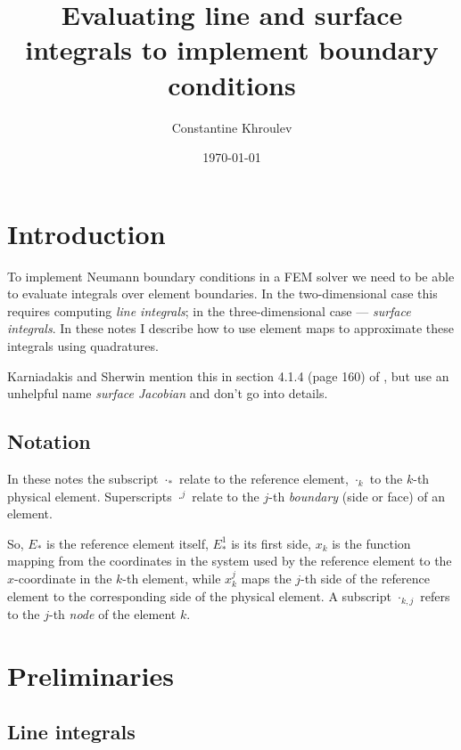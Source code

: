 \documentclass[11pt]{article}
\author{Constantine Khroulev}
\date{\today}
\title{Evaluating line and surface integrals to implement boundary conditions}
\begin{document}
\maketitle
\tableofcontents

\newcommand{\dx}{\Delta x}
\newcommand{\dy}{\Delta y}
\newcommand{\Real}{\mathbb{R}}
\newcommand{\diff}[2]{\frac{\partial #1}{\partial #2}}
\newcommand{\Diff}[2]{\frac{d #1}{d #2}}
\newcommand{\rs}{\R_{s}}
\newcommand{\rt}{\R_{t}}
\newcommand{\R}{\mathbf{r}}
\newcommand{\N}{\mathbf{n}}

\section{Introduction}
\label{sec-1}

To implement Neumann boundary conditions in a FEM solver we need to be
able to evaluate integrals over element boundaries. In the
two-dimensional case this requires computing \emph{line integrals}; in
the three-dimensional case --- \emph{surface integrals}. In these
notes I describe how to use element maps to approximate these
integrals using quadratures.

Karniadakis and Sherwin mention this in section 4.1.4 (page 160) of
\cite{KarniadakisSherwin}, but use an unhelpful name \emph{surface
  Jacobian} and don't go into details.

\subsection{Notation}
\label{sec:notation}

In these notes the subscript $\cdot_{*}$ relate to the reference
element, $\cdot_{k}$ to the $k$-th physical element. Superscripts
$\cdot^{j}$ relate to the $j$-th \emph{boundary} (side or face) of an element.

So, $E_{*}$ is the reference element itself, $E_{*}^{1}$ is its first
side, $x_{k}$ is the function mapping from the coordinates in the
system used by the reference element to the $x$-coordinate in the
$k$-th element, while $x_{k}^{j}$ maps the $j$-th side of the reference
element to the corresponding side of the physical element. A subscript
$\cdot_{k,j}$ refers to the $j$-th \emph{node} of the element $k$.

\section{Preliminaries}
\label{sec-2}

\subsection{Line integrals}
\label{sec-2-1}
\end{document}
